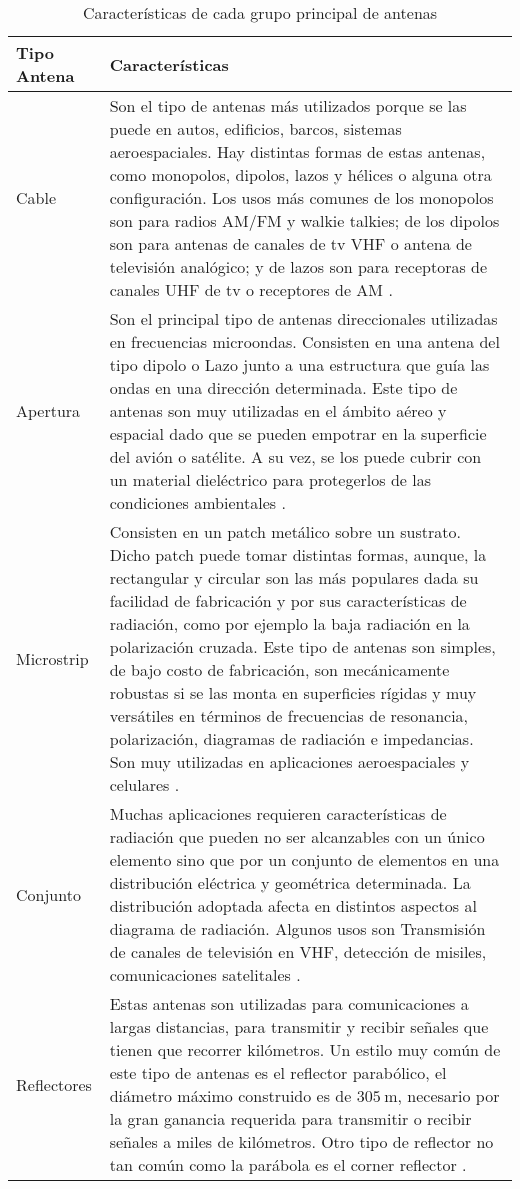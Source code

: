 \begin{table}[H]
  \caption{Características de cada grupo principal de antenas}
  \footnotesize
  \centering
  \begin{tabular}{l p{12.5cm}}
  \toprule
  \textbf{Tipo Antena} & \textbf{Características} \tabularnewline
  \midrule
  Cable & Son el tipo de antenas más utilizados porque se las puede en autos, edificios, barcos, sistemas aeroespaciales. Hay distintas formas de estas antenas, como monopolos, dipolos, lazos y hélices o alguna otra configuración. Los usos más comunes de los monopolos son para radios AM/FM y walkie talkies; de los dipolos son para antenas de canales de tv VHF o antena de televisión analógico; y de lazos son para receptoras de canales UHF de tv o receptores de AM \cite{Balanis2012}. \tabularnewline

  Apertura & Son el principal tipo de antenas direccionales utilizadas en frecuencias microondas. Consisten en una antena
  del tipo dipolo o Lazo junto a una estructura que guía las ondas en una dirección determinada. Este tipo de antenas son muy utilizadas en el ámbito aéreo y espacial dado que se pueden empotrar en la superficie del avión o satélite. A su vez, se los puede cubrir con un material dieléctrico para protegerlos de las condiciones ambientales \cite{Balanis2012}. \tabularnewline
  
  Microstrip & Consisten en un patch metálico sobre un sustrato. Dicho patch puede tomar distintas formas, aunque, la rectangular y circular son las más populares dada su facilidad de fabricación y por sus características de radiación, como por ejemplo la baja radiación en la polarización cruzada. Este tipo de antenas son simples, de bajo costo de fabricación, son mecánicamente robustas si se las monta en superficies rígidas y muy versátiles en términos de frecuencias de resonancia, polarización, diagramas de radiación e impedancias. Son muy utilizadas en aplicaciones aeroespaciales y celulares \cite{Balanis2012}. \tabularnewline

  Conjunto & Muchas aplicaciones requieren características de radiación que pueden no ser alcanzables con un único elemento sino que por un conjunto de elementos en una distribución eléctrica y geométrica determinada. La distribución adoptada afecta en distintos aspectos al diagrama de radiación. Algunos usos son Transmisión de canales de televisión en VHF, detección de misiles, comunicaciones satelitales \cite{Balanis2012}. \tabularnewline
  
  Reflectores & Estas antenas son utilizadas para comunicaciones a largas distancias, para transmitir y recibir señales que tienen que recorrer kilómetros. Un estilo muy común de este tipo de antenas es el reflector parabólico, el diámetro máximo construido es de $\SI{305}{\meter}$, necesario por la gran ganancia requerida para transmitir o recibir señales a miles de kilómetros. Otro tipo de reflector no tan común como la parábola es el corner reflector \cite{Balanis2012}. \tabularnewline


\end{tabular}
\end{table}
